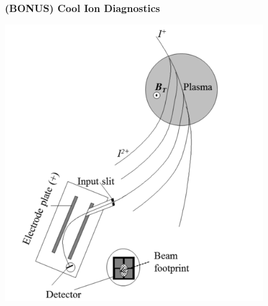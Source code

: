 \documentclass{beamer}
\begin{document}
\begin{frame}
\frametitle{(BONUS) Cool Ion Diagnostics}

    \centering
    \includegraphics[scale=0.6]{imgs/ion-diagnostics.png}

\end{frame}
\end{document}
